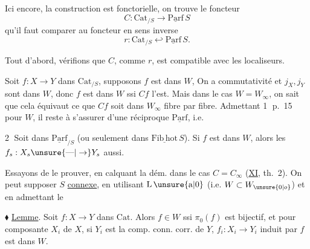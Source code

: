 
 

Ici encore, la construction est fonctorielle, on trouve le foncteur
\[ C:\mathrm{Cat}_{/S}\longrightarrow\underline{\mathrm{Parf}}\,S \]
qu'il faut comparer au foncteur en sens inverse
\[ r:\mathrm{Cat}_{/S}\hookleftarrow\underline{\mathrm{Parf}}\,S. \]

Tout d'abord, vérifions que $C$,  comme $r$, est compatible avec les  localiseurs.

Soit $f:X\to Y$ dans $\mathrm{Cat}_{/S}$, supposons $f$ est dans $W$,   On a commutativité 
et $j_X,j_Y$ sont dans $W$, donc $f$ est dans $W$ ssi $Cf$ l'est.  Mais dans le cas $W=W_\infty$, on sait que cela équivaut  ce que $Cf$ soit dans $W_\infty$ fibre par fibre. Admettant \textcircled{1} p.~15 pour $W$, il reste à s'assurer  d'une réciproque  $\underline{\mathrm{Parf}}$, i.e.

\textcircled{2} Soit
dans $\underline{\mathrm{Parf}}_{/S}$ (ou seulement dans $\underline{\mathrm{Fib}\,\mathrm{hot}}\,S$). Si $f$ est dans $W$, alors les $f_s:X_s\unsure{\text{---}|\to}Y_s$ aussi.


Essayons de le prouver, en calquant la dém. dans le cas $C=C_\infty$ (\uline{XI}, th.~2). On peut supposer $S$ \uline{connexe}, en  utilisant $\mathrm{L}\,\unsure{\mathrm{a}|0}$ (i.e. $W\subset W_{\unsure{0|o}}$) et en admettant le

$\blacklozenge$ \uline{Lemme}. Soit $f:X\to Y$ dans $\mathrm{Cat}$. Alors $f\in W$ ssi $\pi_0(f)$ est bijectif, et pour  composante  $X_i$ de $X$,  si $Y_i$ est la comp. conn. corr. de $Y$, $f_i:X_i\to Y_i$ induit par $f$ est dans $W$.

